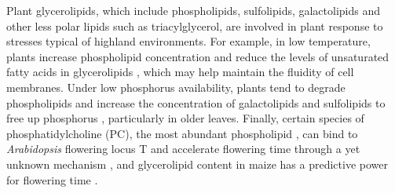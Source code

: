 \documentclass[9pt,twocolumn,twoside,lineno]{BioRxiv}
\begin{document}

Plant glycerolipids, which include phospholipids, sulfolipids, galactolipids and other less polar lipids such as triacylglycerol, are involved in plant response to stresses typical of highland environments.
For example, in low temperature, plants increase phospholipid concentration \cite{Degenkolbe2012-wf} and reduce the levels of unsaturated fatty acids in glycerolipids \cite{Welti2002-uk, Lynch1987-ln}, which may help maintain the fluidity of cell membranes.
Under low phosphorus availability, plants tend to degrade phospholipids and increase the concentration of galactolipids and sulfolipids to free up phosphorus \cite{Lambers2012-an}, particularly in older leaves. 
Finally, certain species of phosphatidylcholine (PC), the most abundant phospholipid \cite{Gu2017-nd}, can bind to \textit{Arabidopsis} flowering locus T and accelerate flowering time through a yet unknown mechanism \cite{Nakamura2014-qf}, and  glycerolipid content in maize has a  predictive power for flowering time \cite{Riedelsheimer2013-bd}. 
\end{document}
